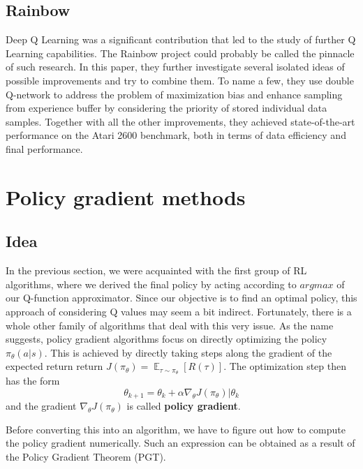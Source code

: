 \subsection*{Rainbow}
Deep Q Learning was a significant contribution that led to the study of further Q Learning capabilities.
The Rainbow project \cite{Rainbow} could probably be called the pinnacle of such research.
In this paper, they further investigate several isolated ideas of possible improvements and try to combine them.
To name a few, they use double Q-network to address the problem of maximization bias and enhance sampling from experience buffer by considering the priority of stored individual data samples.
Together with all the other improvements, they achieved state-of-the-art performance on the Atari 2600 benchmark, both in terms of data efficiency and final performance.







\section{Policy gradient methods}
\subsection{Idea}
In the previous section, we were acquainted with the first group of RL algorithms, where we derived the final policy by acting according to $argmax$ of our Q-function approximator.
Since our objective is to find an optimal policy, this approach of considering Q values may seem a bit indirect.
Fortunately, there is a whole other family of algorithms that deal with this very issue.
As the name suggests, policy gradient algorithms focus on directly optimizing the policy $\pi_\theta(a|s)$. 
This is achieved by directly taking steps along the gradient of the expected return return $J(\pi_\theta) = \mathop{\mathbb{E}}_{\tau \sim \pi_\theta}[R(\tau)]$.
The optimization step then has the form
\[\theta_{k+1} = \theta_k+\alpha  \nabla_\theta J(\pi_\theta)|\theta_k\] and the gradient $\nabla_\theta J(\pi_\theta)$ is called \textbf{policy gradient}.

Before converting this into an algorithm, we have to figure out how to compute the policy gradient numerically.
Such an expression can be obtained as a result of the Policy Gradient Theorem (PGT).

